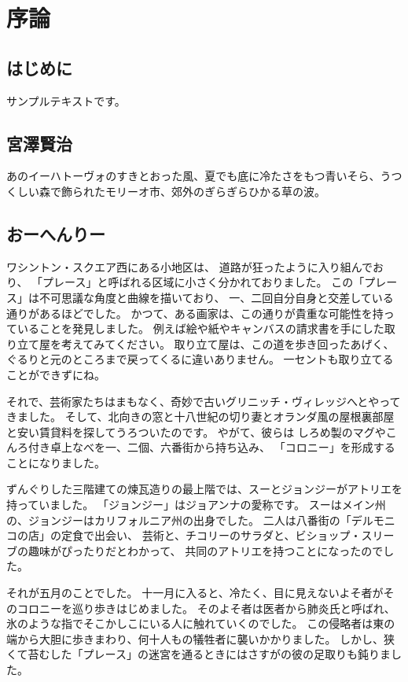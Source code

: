 \chapter{序論}

\section{はじめに}
サンプルテキストです。
\section{宮澤賢治}
あのイーハトーヴォのすきとおった風、夏でも底に冷たさをもつ青いそら、うつくしい森で飾られたモリーオ市、郊外のぎらぎらひかる草の波。

\section{おーへんりー}

ワシントン・スクエア西にある小地区は、 道路が狂ったように入り組んでおり、 「プレース」と呼ばれる区域に小さく分かれておりました。 この「プレース」は不可思議な角度と曲線を描いており、 一、二回自分自身と交差している通りがあるほどでした。 かつて、ある画家は、この通りが貴重な可能性を持っていることを発見しました。 例えば絵や紙やキャンバスの請求書を手にした取り立て屋を考えてみてください。 取り立て屋は、この道を歩き回ったあげく、 ぐるりと元のところまで戻ってくるに違いありません。 一セントも取り立てることができずにね。

それで、芸術家たちはまもなく、奇妙で古いグリニッチ・ヴィレッジへとやってきました。 そして、北向きの窓と十八世紀の切り妻とオランダ風の屋根裏部屋と安い賃貸料を探してうろついたのです。 やがて、彼らは しろめ製のマグやこんろ付き卓上なべを一、二個、六番街から持ち込み、 「コロニー」を形成することになりました。

ずんぐりした三階建ての煉瓦造りの最上階では、スーとジョンジーがアトリエを持っていました。 「ジョンジー」はジョアンナの愛称です。 スーはメイン州の、ジョンジーはカリフォルニア州の出身でした。 二人は八番街の「デルモニコの店」の定食で出会い、 芸術と、チコリーのサラダと、ビショップ・スリーブの趣味がぴったりだとわかって、 共同のアトリエを持つことになったのでした。

それが五月のことでした。 十一月に入ると、冷たく、目に見えないよそ者がそのコロニーを巡り歩きはじめました。 そのよそ者は医者から肺炎氏と呼ばれ、 氷のような指でそこかしこにいる人に触れていくのでした。 この侵略者は東の端から大胆に歩きまわり、何十人もの犠牲者に襲いかかりました。 しかし、狭くて苔むした「プレース」の迷宮を通るときにはさすがの彼の足取りも鈍りました。

